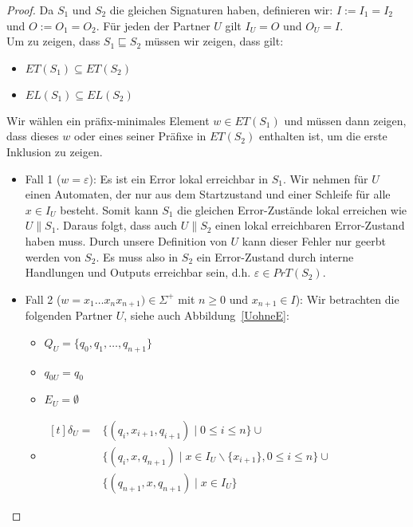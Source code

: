 \begin{proof}
  Da $S_1$ und $S_2$ die gleichen Signaturen haben, definieren wir:
  $I:=I_1=I_2$ und $O:=O_1=O_2$. Für jeden der Partner $U$ gilt $I_U=O$ und
  $O_U=I$.\\
  Um zu zeigen, dass $S_1\sqsubseteq S_2$ müssen wir zeigen, dass gilt:
  \begin{itemize}
    \item $ET(S_1)\subseteq ET(S_2)$
    \item $EL(S_1)\subseteq EL(S_2)$
  \end{itemize}
  Wir wählen ein präfix-minimales Element $w\in ET(S_1)$ und müssen dann
  zeigen, dass dieses $w$ oder eines seiner Präfixe in $ET(S_2)$ enthalten ist,
  um
  die erste Inklusion zu zeigen.
  \begin{itemize}
    \item Fall 1 ($w=\varepsilon$): Es ist ein Error lokal erreichbar in $S_1$.
      Wir nehmen für $U$ einen Automaten, der nur aus dem Startzustand und
      einer Schleife für alle $x\in I_U$ besteht. Somit kann $S_1$ die gleichen
      Error-Zustände lokal erreichen wie $U\|S_1$. Daraus folgt, dass auch
      $U\|S_2$ einen lokal erreichbaren Error-Zustand haben muss. Durch unsere
      Definition von $U$ kann dieser Fehler nur geerbt werden von $S_2$. Es
      muss also in $S_2$ ein Error-Zustand durch interne Handlungen und Outputs
      erreichbar sein, d.h. $\varepsilon\in PrT(S_2)$.
    \item Fall 2 ($w=x_1\dots x_n x_{n+1})\in\Sigma ^+$ mit $n\geq 0$ und
      $x_{n+1}\in I$): Wir betrachten die folgenden Partner $U$, siehe auch
      Abbildung~\ref{UohneE}:
      \begin{itemize}
        \item $Q_U=\{q_0,q_1,\dots ,q_{n+1}\}$
        \item $q_{0U}=q_0$
        \item $E_U=\emptyset$
        \item $\begin{aligned}[t]
            \delta _U=&\{(q_i,x_{i+1},q_{i+1})\mid  0\leq i\leq n\}\cup\\
                      &\{(q_i,x,q_{n+1})\mid  x\in I_U\backslash\{x_{i+1}\},
          0\leq i\leq n\}\cup\\
          &\{(q_{n+1},x,q_{n+1})\mid  x\in I_U\}
        \end{aligned}$
      \end{itemize}
      \begin{figure} [h!tbp]
      \begin{center}
        \begin{tikzpicture}[->, >=latex',auto,node distance =3cm, semithick]


\end{tikzpicture}
\end{center}
\end{figure}
\end{itemize}
\end{proof}
